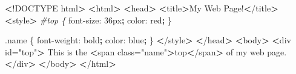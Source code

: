 \documentclass[]{book}
\newenvironment{Shaded}{\begin{snugshade}}{\end{snugshade}}
\newcommand{\KeywordTok}[1]{\textcolor[rgb]{0.13,0.29,0.53}{\textbf{#1}}}
\newcommand{\StringTok}[1]{\textcolor[rgb]{0.31,0.60,0.02}{#1}}
\newcommand{\CommentTok}[1]{\textcolor[rgb]{0.56,0.35,0.01}{\textit{#1}}}
\newcommand{\FunctionTok}[1]{\textcolor[rgb]{0.00,0.00,0.00}{#1}}
\newcommand{\OperatorTok}[1]{\textcolor[rgb]{0.81,0.36,0.00}{\textbf{#1}}}
\newcommand{\ExtensionTok}[1]{#1}
\newcommand{\NormalTok}[1]{#1}
\begin{document}
\begin{Shaded}
\begin{Highlighting}[]
\OperatorTok{<}\NormalTok{!}\ExtensionTok{DOCTYPE}\NormalTok{ html}\OperatorTok{>}                                                         
\OperatorTok{<}\ExtensionTok{html}\OperatorTok{>}                                                                  
    \OperatorTok{<}\FunctionTok{head}\OperatorTok{>}                                                              
        \OperatorTok{<}\ExtensionTok{title}\OperatorTok{>}\NormalTok{My Web Page!}\OperatorTok{<}\NormalTok{/title}\OperatorTok{>}                                     
        \OperatorTok{<}\ExtensionTok{style}\OperatorTok{>}                                                         
            \CommentTok{#top \{                                                      }
                \ExtensionTok{font-size}\NormalTok{: 36px}\KeywordTok{;}                                        
                \ExtensionTok{color}\NormalTok{: red}\KeywordTok{;}                                             
\NormalTok{            \}                                                           }
                                                                        
            \ExtensionTok{.name}\NormalTok{ \{                                                     }
                \ExtensionTok{font-weight}\NormalTok{: bold}\KeywordTok{;}                                      
                \ExtensionTok{color}\NormalTok{: blue}\KeywordTok{;}                                            
\NormalTok{            \}                                                           }
        \OperatorTok{<}\NormalTok{/}\ExtensionTok{style}\OperatorTok{>}                                                        
    \OperatorTok{<}\NormalTok{/}\ExtensionTok{head}\OperatorTok{>}                                                             
    \OperatorTok{<}\ExtensionTok{body}\OperatorTok{>}                                                              
        \OperatorTok{<}\ExtensionTok{div}\NormalTok{ id=}\StringTok{"top"}\OperatorTok{>}                                                  
            \ExtensionTok{This}\NormalTok{ is the }\OperatorTok{<}\NormalTok{span class=}\StringTok{"name"}\OperatorTok{>}\NormalTok{top}\OperatorTok{<}\NormalTok{/span}\OperatorTok{>}\NormalTok{ of my web page.   }
        \OperatorTok{<}\NormalTok{/}\ExtensionTok{div}\OperatorTok{>}                                                          
    \OperatorTok{<}\NormalTok{/}\ExtensionTok{body}\OperatorTok{>}                                                             
\OperatorTok{<}\NormalTok{/}\ExtensionTok{html}\OperatorTok{>}
\end{Highlighting}
\end{Shaded}
\end{document}

